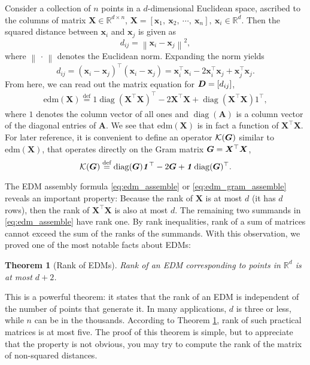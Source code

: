 \documentclass[10pt,double]{IEEEtran}
\newtheorem{thm}{Theorem}
\providecommand{\R}{\ensuremath{\mathbb{R}}}
\providecommand{\norm}[1]{\left\lVert#1\right\rVert}
\providecommand{\bydef}{\overset{\text{def}}{=}}
\providecommand{\diag}{\mathop{\mathrm{diag}}}
\renewcommand{\vec}[1]{\ensuremath{\boldsymbol{#1}}}
\providecommand{\mat}[1]{\ensuremath{\boldsymbol{#1}}}
\providecommand{\mA}{\mat{A}} \providecommand{\mB}{\mat{B}}
\providecommand{\mX}{\mat{X}}\providecommand{\mY}{\mat{Y}}
\providecommand{\vx}{\vec{x}} \providecommand{\vy}{\vec{y}}
\newcommand{\EDM}{\ensuremath{\mathrm{edm}}}
\newcommand{\EDMgram}{\ensuremath{\mathcal{K}}}
\newcommand{\vone}{\ensuremath{\vec{\mathit{1}}}}
\newcommand{\T}{\ensuremath{\top}}
\renewcommand{\diag}{\mathop{\mathrm{diag}}}
\begin{document}
Consider a collection of $n$ points in a $d$-dimensional Euclidean space,
ascribed to the columns of matrix $\mX \in \R^{d \times n}$, $\mX = [\vx_1, \
\vx_2, \ \cdots,\
\vx_n], \ \vx_i \in \R^d$. Then the squared distance between $
\vx_i$ and $\vx_j$ is given as
\begin{equation}
	d_{ij} = \norm{\vx_i - \vx_j}^2,
\end{equation}
where $\norm{\, \cdot \,}$ denotes the Euclidean norm. Expanding the norm
yields
\begin{equation}
	d_{ij} = (\vx_i-\vx_j)^\T(\vx_i-\vx_j) = \vx_i^\T \vx_i - 2\vx_i^\T \vx_j + \vx_j^\T \vx_j.
\end{equation}
From here, we can read out the matrix equation for $\mD = [d_{ij}]$,
\begin{equation}
	\label{eq:edm_assemble}
	\begin{aligned}
	\EDM(\mX) \bydef \vone \diag(\mX^\T \mX)^\T - 2\mX^\T \mX + \diag(\mX^\T
	\mX) \vone^\T,
	\end{aligned}
\end{equation}
where $\vone$ denotes the column vector of all ones and $\diag(\mA)$ is a
column vector of the diagonal entries of $\mA$. We see that $\EDM(\mX)$ is in
fact a function of $\mX^\T \mX$. For later reference, it is convenient to
define an operator $\EDMgram(\mG)$ similar to $\EDM(\mX)$, that operates
directly on the Gram matrix $\mG = \mX^\T \mX$,
\begin{equation}
	\label{eq:edm_gram_assemble}
	\EDMgram(\mG) \bydef \diag(\mG) \vone^\T  - 2 \mG + \vone \diag(\mG)^\T.
\end{equation}

The EDM assembly formula \eqref{eq:edm_assemble} or
\eqref{eq:edm_gram_assemble} reveals an important property: Because the rank
of $\mX$ is at most $d$ (it has $d$ rows), then the rank of $\mX^\T \mX$ is
also at most $d$. The remaining two summands in
\eqref{eq:edm_assemble} have rank one. By rank inequalities, rank of a sum of
matrices cannot exceed the sum of the ranks of the summands. With this
observation, we proved one of the most notable facts about EDMs:

\begin{thm}[Rank of EDMs]
\label{thm:edm_rank}
Rank of an EDM corresponding to points in $\R^d$ is at most $d+2$.
\end{thm}

This is a powerful theorem: it states that the rank of an EDM is independent
of the number of points that generate it. In many applications, $d$ is three
or less, while $n$ can be in the thousands. According to Theorem
\ref{thm:edm_rank}, rank of such practical matrices is at most five. The proof
of this theorem is simple, but to appreciate that the property is not obvious,
you may try to compute the rank of the matrix of non-squared distances.
\end{document}
